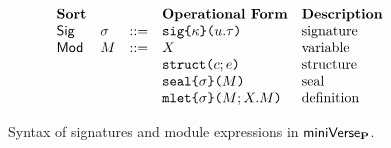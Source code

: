 \begin{figure}[p] 
\[\begin{array}{lllllll}
\textbf{Sort} & & & \textbf{Operational Form} 
& \textbf{Description}\\
\mathsf{Sig} & \sigma & ::= & \asignature{\kappa}{u}{\tau} 
& \text{signature}\\
\mathsf{Mod} & M & ::= & X 
& \text{variable}\\
&&& \astruct{c}{e} 
& \text{structure}\\
&&& \aseal{\sigma}{M} 
& \text{seal}\\
&&& \amlet{\sigma}{M}{X}{M} %
& \text{definition}
\end{array}\]
\caption[Syntax of signatures and module expressions in $\miniVerseParam$]{Syntax of signatures and module expressions in $\miniVerseParam$.}
\label{fig:P-modules-signatures}
\end{figure}


